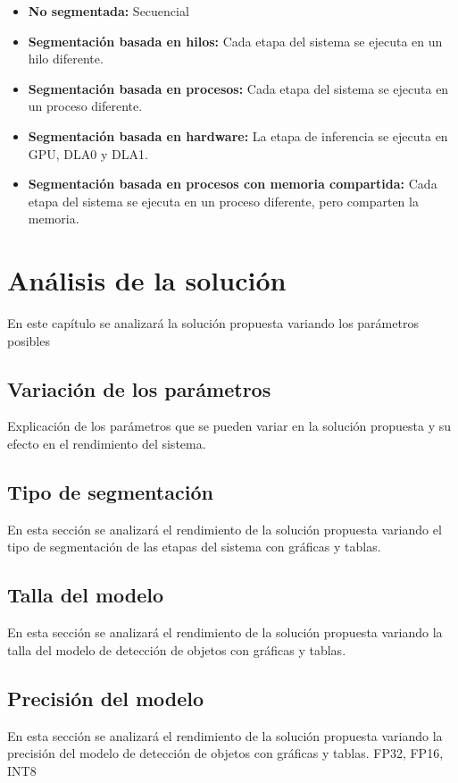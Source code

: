 \documentclass[11pt,catalan,listoffigures,listoftables]{tfgetsinf}
\begin{document}
\begin{itemize}
   \item \textbf{No segmentada:} Secuencial
   \item \textbf{Segmentación basada en hilos:} Cada etapa del sistema se ejecuta en un hilo diferente.
   \item \textbf{Segmentación basada en procesos:} Cada etapa del sistema se ejecuta en un proceso diferente.
   \item \textbf{Segmentación basada en hardware:} La etapa de inferencia se ejecuta en GPU, DLA0 y DLA1.
   \item \textbf{Segmentación basada en procesos con memoria compartida:} Cada etapa del sistema se ejecuta en un proceso diferente, pero comparten la memoria.
\end{itemize}

    


\chapter{Análisis de la solución}

En este capítulo se analizará la solución propuesta variando los parámetros posibles

\section{Variación de los parámetros}
Explicación de los parámetros que se pueden variar en la solución propuesta y su efecto en el rendimiento del sistema.
\section{Tipo de segmentación}
En esta sección se analizará el rendimiento de la solución propuesta variando el tipo de segmentación de las etapas del sistema con gráficas y tablas.

\section{Talla del modelo}
En esta sección se analizará el rendimiento de la solución propuesta variando la talla del modelo de detección de objetos con gráficas y tablas.

\section{Precisión del modelo}
En esta sección se analizará el rendimiento de la solución propuesta variando la precisión del modelo de detección de objetos con gráficas y tablas. {FP32, FP16, INT8}
\end{document}
